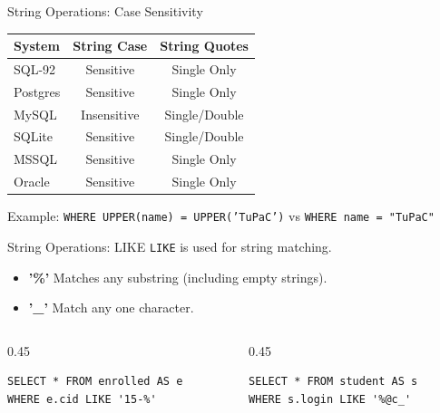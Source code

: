 \documentclass[aspectratio=169]{beamer}
\begin{document}
\begin{frame}{String Operations: Case Sensitivity}
    \begin{table}
        \begin{tabular}{l c c}
            \toprule
            \textbf{System} & \textbf{String Case} & \textbf{String Quotes} \\
            \midrule
            SQL-92 & Sensitive & Single Only \\
            Postgres & Sensitive & Single Only \\
            MySQL & Insensitive & Single/Double \\
            SQLite & Sensitive & Single/Double \\
            MSSQL & Sensitive & Single Only \\
            Oracle & Sensitive & Single Only \\
            \bottomrule
        \end{tabular}
    \end{table}
    \footnotesize
    Example: \texttt{WHERE UPPER(name) = UPPER('TuPaC')} vs \texttt{WHERE name = "TuPaC"}
\end{frame}

\begin{frame}[fragile]{String Operations: LIKE}
    \texttt{LIKE} is used for string matching.
    \begin{itemize}
        \item \textbf{'\%'} Matches any substring (including empty strings).
        \item \textbf{'\_'} Match any one character.
    \end{itemize}
    
    \begin{columns}
        \begin{column}{0.45\textwidth}
        \begin{lstlisting}
SELECT * FROM enrolled AS e
WHERE e.cid LIKE '15-%'
        \end{lstlisting}
        \end{column}
        \begin{column}{0.45\textwidth}
        \begin{lstlisting}
SELECT * FROM student AS s
WHERE s.login LIKE '%@c_'
        \end{lstlisting}
        \end{column}
    \end{columns}
\end{frame}
\end{document}
